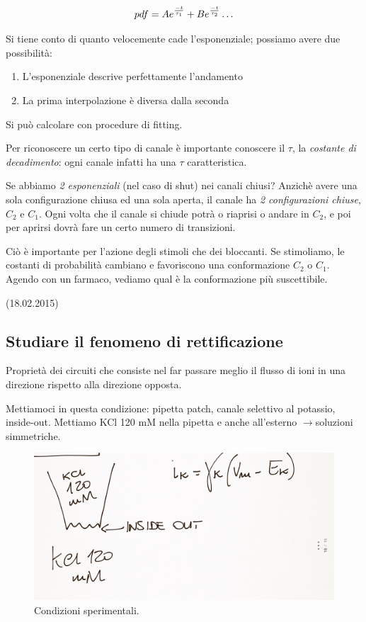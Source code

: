 \documentclass[a4paper,12pt]{article}
\newcommand{\lfreccia}{\ensuremath{\longrightarrow}}
\begin{document}
\begin{equation}
\centering
pdf= Ae^{\frac{-t}{\tau_{1}}} + Be^{\frac{-t}{\tau_{2}}} \ldots 
\end{equation}

Si tiene conto di quanto velocemente cade l'esponenziale; possiamo avere due possibilità:
\begin{enumerate}
\item{L'esponenziale descrive perfettamente l'andamento}
\item{La prima interpolazione è diversa dalla seconda}
\end{enumerate}

Si può calcolare con procedure di fitting.

Per riconoscere un certo tipo di canale è importante conoscere il $\tau$, la \emph{costante di decadimento}: ogni canale infatti ha una $\tau$ caratteristica. 

Se abbiamo \emph{2 esponenziali} (nel caso di shut) nei canali chiusi? Anzichè avere una sola configurazione chiusa ed una sola aperta, il canale ha \emph{2 configurazioni chiuse}, $C_{2}$ e $C_{1}$. Ogni volta che il canale si chiude potrà o riaprisi o andare in $C_{2}$, e poi per aprirsi dovrà fare un certo numero di transizioni.

Ciò è importante per l'azione degli stimoli che dei bloccanti. Se stimoliamo, le costanti di probabilità cambiano e favoriscono una conformazione $C_{2}$ o $C_{1}$. Agendo con un farmaco, vediamo qual è la conformazione più suscettibile.

(18.02.2015)
\subsection{Studiare il fenomeno di rettificazione}
Proprietà dei circuiti che consiste nel  far passare  meglio il flusso di ioni in una direzione rispetto alla direzione opposta.

Mettiamoci in questa condizione: pipetta patch, canale selettivo al potassio, inside-out. Mettiamo KCl 120 mM nella pipetta e anche all'esterno \lfreccia soluzioni simmetriche.
\begin{figure}[H]
\centering
\includegraphics[scale=0.1]{immagine/14.jpg}
\caption{Condizioni sperimentali.}
\end{figure} 
\end{document}
